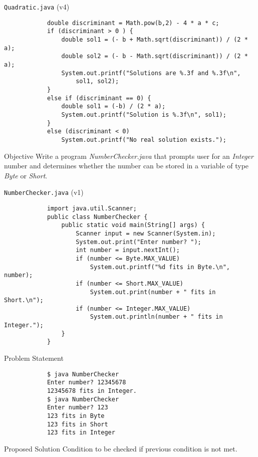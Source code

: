 \documentclass[10pt, compress]{beamer}
\begin{document}
\begin{slide}
	\begin{block}{\texttt{Quadratic.java} (v4)}
		\begin{verbatim}
			double discriminant = Math.pow(b,2) - 4 * a * c;
			if (discriminant > 0 ) {
			    double sol1 = (- b + Math.sqrt(discriminant)) / (2 * a);
			    double sol2 = (- b - Math.sqrt(discriminant)) / (2 * a);
			    System.out.printf("Solutions are %.3f and %.3f\n",
			        sol1, sol2);
			}
			else if (discriminant == 0) {
			    double sol1 = (-b) / (2 * a);
			    System.out.printf("Solution is %.3f\n", sol1);
			}
			else (discriminant < 0)
			    System.out.printf("No real solution exists.");
		\end{verbatim}
	\end{block}
\end{slide}

\begin{slide}
	\begin{block}{Objective}
		Write a program \textit{NumberChecker.java} that prompts user for an \textit{Integer} number and determines whether the number can be stored in a variable of type \textit{Byte} or \textit{Short}.
	\end{block}
\end{slide}

\begin{slide}
	\begin{block}{\texttt{NumberChecker.java} (v1)}
		\begin{verbatim}
			import java.util.Scanner;
			public class NumberChecker {
			    public static void main(String[] args) {
			        Scanner input = new Scanner(System.in);
			        System.out.print("Enter number? ");
			        int number = input.nextInt();
			        if (number <= Byte.MAX_VALUE)
			            System.out.printf("%d fits in Byte.\n", number);
			        if (number <= Short.MAX_VALUE)
			            System.out.print(number + " fits in Short.\n");
			        if (number <= Integer.MAX_VALUE)
			            System.out.println(number + " fits in Integer.");
			    }
			}
		\end{verbatim}
	\end{block}
\end{slide}

\begin{slide}
	\begin{block}{Problem Statement}
		\begin{verbatim}
			$ java NumberChecker
			Enter number? 12345678
			12345678 fits in Integer.
			$ java NumberChecker
			Enter number? 123
			123 fits in Byte
			123 fits in Short
			123 fits in Integer
		\end{verbatim}
	\end{block}
	\begin{block}{Proposed Solution}
		Condition to be checked if previous condition is not met.
	\end{block}
\end{slide}
\end{document}
